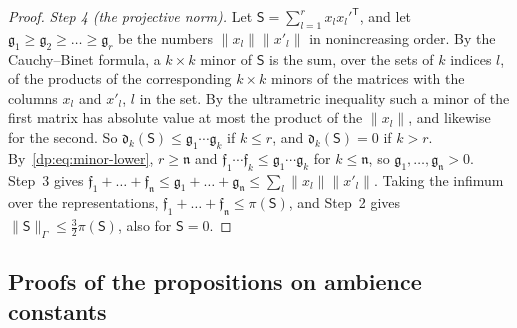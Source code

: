 \documentclass[11pt]{amsart}
\theoremstyle{definition}
\theoremstyle{remark}
\numberwithin{equation}{section}
\newcommand{\norm}[1]{\lVert #1\rVert}
\theoremstyle{plain}
\theoremstyle{definition}
\theoremstyle{plain}
\begin{document}
\begin{proof}
\emph{Step 4 (the projective norm).} Let $\mathsf S=\sum_{l=1}^rx_lx_l'^{\mathsf T}$, and let $\mathfrak g_1\ge\mathfrak g_2\ge\dots\ge\mathfrak g_r$ be the numbers $\norm{x_l}\norm{x'_l}$ in nonincreasing order. By the Cauchy--Binet formula, a $k\times k$ minor of $\mathsf S$ is the sum, over the sets of $k$ indices $l$, of the products of the corresponding $k\times k$ minors of the matrices with the columns $x_l$ and $x'_l$, $l$ in the set. By the ultrametric inequality such a minor of the first matrix has absolute value at most the product of the $\norm{x_l}$, and likewise for the second. So $\mathfrak d_k(\mathsf S)\le\mathfrak g_1\cdots\mathfrak g_k$ if $k\le r$, and $\mathfrak d_k(\mathsf S)=0$ if $k>r$. By~\eqref{dp:eq:minor-lower}, $r\ge\mathfrak n$ and $\mathfrak f_1\cdots\mathfrak f_k\le\mathfrak g_1\cdots\mathfrak g_k$ for $k\le\mathfrak n$, so $\mathfrak g_1,\dots,\mathfrak g_{\mathfrak n}>0$. Step~3 gives $\mathfrak f_1+\dots+\mathfrak f_{\mathfrak n}\le\mathfrak g_1+\dots+\mathfrak g_{\mathfrak n}\le\sum_l\norm{x_l}\norm{x'_l}$. Taking the infimum over the representations, $\mathfrak f_1+\dots+\mathfrak f_{\mathfrak n}\le\pi(\mathsf S)$, and Step~2 gives $\norm{\mathsf S}_\Gamma\le\frac32\pi(\mathsf S)$, also for $\mathsf S=0$.
\end{proof}

\subsection{Proofs of the propositions on ambience constants}\label{dp:ac:proofs}
\end{document}
